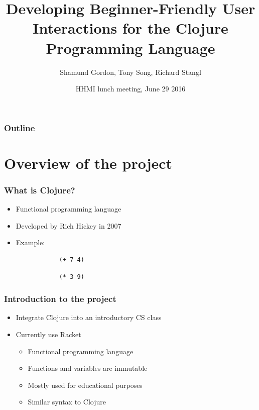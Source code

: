 \documentclass{beamer}
\begin{document}
\title{Developing Beginner-Friendly User Interactions for the Clojure Programming Language}
\author{Shamund Gordon, Tony Song, Richard Stangl}
\date[]  
{HHMI lunch meeting, June 29 2016}

\begin{frame}
  \titlepage
\end{frame}


\begin{frame}

\frametitle{Outline}
\tableofcontents
\end{frame}

\section{Overview of the project}

\begin{frame}[fragile]
	\frametitle{What is Clojure?}
	\begin{itemize}
		\item Functional programming language
		\item Developed by Rich Hickey in 2007
		\item Example: 
		\begin{verbatim}
			(+ 7 4)
		\end{verbatim}
		\begin{verbatim}
			(* 3 9)
		\end{verbatim}
	\end{itemize}
\end{frame}


\begin{frame}
	\frametitle{Introduction to the project}
	\begin{itemize}
		\item Integrate Clojure into an introductory CS class
		\item Currently use Racket
		\begin{itemize}
		\item Functional programming language
		\item Functions and variables are immutable
		\item Mostly used for educational purposes
		\item Similar syntax to Clojure
		\end{itemize}
	\end{itemize}
\end{frame}
\end{document}
